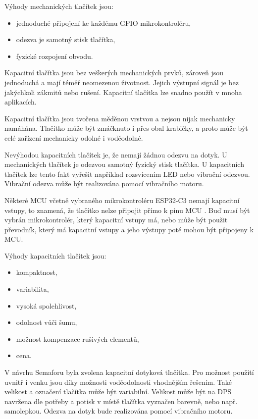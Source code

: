 Výhody mechanických tlačítek jsou:
\begin{itemize}
  \item jednoduché připojení ke každému GPIO mikrokontroléru,
  \item odezva je samotný stisk tlačítka,
  \item fyzické rozpojení obvodu.
\end{itemize}

Kapacitní tlačítka jsou bez veškerých mechanických prvků, zároveň jsou jednoduchá a mají téměř neomezenou 
životnost. Jejich výstupní signál je bez jakýchkoli zákmitů nebo rušení. Kapacitní tlačítka lze snadno použít v mnoha aplikacích. 

Kapacitní tlačítka jsou tvořena měděnou vrstvou a nejsou nijak mechanicky namáhána. Tlačítko může být zmáčknuto i přes 
obal krabičky, a proto může být celé zařízení mechanicky odolné i voděodolné. 

Nevýhodou kapacitních tlačítek je, že nemají žádnou odezvu na dotyk. U mechanických tlačítek je odezvou samotný fyzický 
stisk tlačítka. U kapacitních tlačítek lze tento fakt vyřešit například rozsvícením LED nebo vibrační odezvou. Vibrační 
odezva může být realizována pomocí vibračního motoru. 

Některé MCU včetně vybraného mikrokontroléru ESP32-C3 nemají kapacitní
vstupy, to znamená, že tlačítko nelze připojit přímo k pinu MCU \cite{ESP_C3_dtsh}. Buď musí být vybrán mikrokontrolér, který kapacitní 
vstupy má, nebo může být použit převodník, který má kapacitní vstupy a jeho výstupy poté mohou být připojeny k MCU. 

Výhody kapacitních tlačítek jsou:
\begin{itemize}
  \item kompaktnost,
  \item variabilita,
  \item vysoká spolehlivost,
  \item odolnost vůči šumu,
  \item možnost kompenzace rušivých elementů,
  \item cena. 
\end{itemize}

V návrhu Semaforu byla zvolena kapacitní dotyková tlačítka. Pro možnost použití uvnitř i venku jsou díky možnosti voděodolnosti 
vhodnějším řešením. Také velikost a označení tlačítka může být variabilní. Velikost může být na DPS navržena dle potřeby a potisk
v místě tlačítka vyznačen barevně, nebo např. samolepkou. Odezva na dotyk bude realizována pomocí vibračního motoru.


